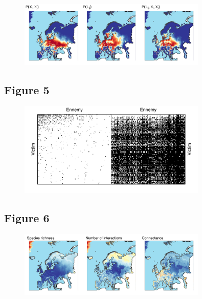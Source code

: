 \documentclass[12pt]{article}
\begin{document}
\begin{figure}[ht!]
\centering\includegraphics[width=0.8\textwidth]{figures/map_pair}
\end{figure}

\newpage

\subsection*{Figure 5}

\begin{figure}[ht!]
\centering\includegraphics[width=0.8\textwidth]{figures/mw_holes}
\end{figure}

\newpage

\subsection*{Figure 6}

\begin{figure}[ht!]
\centering\includegraphics[width=0.8\textwidth]{figures/map_connectance}
\end{figure}

\newpage


\end{document}
